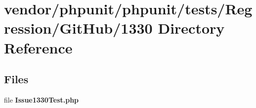 \section{vendor/phpunit/phpunit/tests/\+Regression/\+Git\+Hub/1330 Directory Reference}
\label{dir_edc4f8c5421deab21abdb27a248c003c}
\subsection*{Files}
\begin{DoxyCompactItemize}
\item 
file {\bf Issue1330\+Test.\+php}
\end{DoxyCompactItemize}
